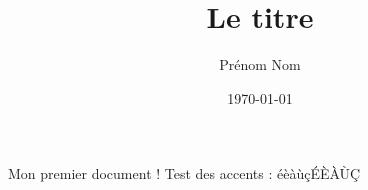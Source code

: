 \documentclass[a4paper]{article}
\author{Prénom Nom}
\title{Le titre}
\date{\today}
\begin{document}
  \maketitle
  Mon premier document !
  Test des accents : éèàùçÉÈÀÙÇ
\end{document}
